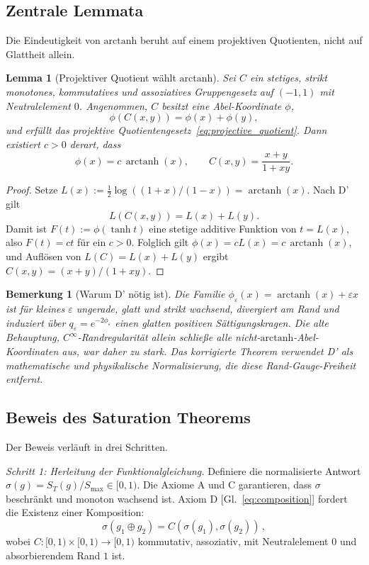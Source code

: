 \documentclass[aps,prd,twocolumn,superscriptaddress,nofootinbib]{revtex4-2}
\newtheorem{lemma}{Lemma}
\newtheorem{remark}{Bemerkung}
\begin{document}
\subsection{Zentrale Lemmata}

Die Eindeutigkeit von $\mathrm{arctanh}$ beruht auf einem projektiven Quotienten, nicht auf Glattheit allein.

\begin{lemma}[Projektiver Quotient wählt $\mathrm{arctanh}$]\label{lem:projective_arctanh}
Sei $C$ ein stetiges, strikt monotones, kommutatives und assoziatives Gruppengesetz auf $(-1,1)$ mit Neutralelement $0$. Angenommen, $C$ besitzt eine Abel-Koordinate $\phi$,
\[
  \phi(C(x,y))=\phi(x)+\phi(y),
\]
und erfüllt das projektive Quotientengesetz~\eqref{eq:projective_quotient}. Dann existiert $c>0$ derart, dass
\[
  \phi(x)=c\,\operatorname{arctanh}(x),
  \qquad
  C(x,y)=\frac{x+y}{1+xy}.
\]
\end{lemma}

\begin{proof}
Setze $L(x):=\frac12\log((1+x)/(1-x))=\operatorname{arctanh}(x)$. Nach D' gilt
\[
  L(C(x,y))=L(x)+L(y).
\]
Damit ist $F(t):=\phi(\tanh t)$ eine stetige additive Funktion von $t=L(x)$, also $F(t)=ct$ für ein $c>0$. Folglich gilt $\phi(x)=cL(x)=c\,\operatorname{arctanh}(x)$, und Auflösen von $L(C)=L(x)+L(y)$ ergibt $C(x,y)=(x+y)/(1+xy)$.
\end{proof}

\begin{remark}[Warum D' nötig ist]
Die Familie $\phi_\varepsilon(x)=\operatorname{arctanh}(x)+\varepsilon x$ ist für kleines $\varepsilon$ ungerade, glatt und strikt wachsend, divergiert am Rand und induziert über $q_\varepsilon=e^{-2\phi_\varepsilon}$ einen glatten positiven Sättigungskragen. Die alte Behauptung, $C^\infty$-Randregularität allein schließe alle nicht-$\mathrm{arctanh}$-Abel-Koordinaten aus, war daher zu stark. Das korrigierte Theorem verwendet D' als mathematische und physikalische Normalisierung, die diese Rand-Gauge-Freiheit entfernt.
\end{remark}

\subsection{Beweis des Saturation Theorems}

Der Beweis verläuft in drei Schritten.

\textit{Schritt 1: Herleitung der Funktionalgleichung.}
Definiere die normalisierte Antwort $\sigma(g) = S_T(g)/S_{\max} \in [0, 1)$. Die Axiome A und C garantieren, dass $\sigma$ beschränkt und monoton wachsend ist. Axiom D [Gl.~\eqref{eq:composition}] fordert die Existenz einer Komposition:
\begin{equation}
\sigma(g_1 \oplus g_2) = C(\sigma(g_1), \sigma(g_2))\,,
\label{eq:normalized_composition}
\end{equation}
wobei $C: [0,1) \times [0,1) \to [0,1)$ kommutativ, assoziativ, mit Neutralelement $0$ und absorbierendem Rand $1$ ist.
\end{document}
